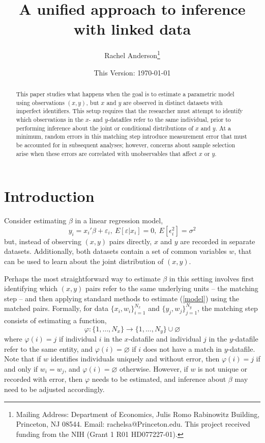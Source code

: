 \documentclass[12pt]{article}
\title{\singlespacing A unified approach to inference with linked data}
\author{Rachel Anderson\thanks{Mailing Address: Department of Economics, Julis Romo Rabinowitz Building,
Princeton, NJ 08544. Email: rachelsa@Princeton.edu.
This project received funding from the NIH (Grant 1 R01 HD077227-01). }}
\date{This Version: \today}
\begin{document}
\maketitle


\begin{abstract}
\singlespacing
\noindent This paper studies what happens when the goal is to estimate a parametric model using observations $(x,y)$, but $x$ and $y$ are observed in distinct datasets with imperfect identifiers.  This setup requires that the researcher must attempt to identify which observations in the $x$- and $y$-datafiles refer to the same individual, prior to performing inference about the joint or conditional distributions of $x$ and $y$.  At a minimum, random errors in this matching step introduce measurement error that must be accounted for in subsequent analyses; however, concerns about sample selection arise when these errors are correlated with unobservables that affect $x$ or $y$.  \end{abstract}


\section{Introduction}

Consider estimating $\beta$ in a linear regression model, \begin{equation} y_i = x_i'\beta + \varepsilon_i, \ E[\varepsilon | x_i] = 0, \ E[\epsilon_i^2] = \sigma^2  \label{model} \end{equation}
but, instead of observing $(x, y)$ pairs directly,  $x$ and $y$ are recorded in separate datasets.  Additionally, both datasets contain a set of common variables $w$, that can be used to learn about the joint distribution of $(x,y)$.

Perhaps the most straightforward way to estimate $\beta$ in this setting involves first identifying which $(x,y)$ pairs refer to the same underlying units -- the matching step -- and then applying standard methods to estimate (\ref{model}) using the matched pairs.   Formally, for data $\{x_i, w_i\}_{i=1}^{N_x}$ and $\{y_j, w_j\}_{j=1}^{N_y}$, the matching step consists of estimating a function, \begin{equation} \varphi: \{1,\dots, N_x\} \to \{1,\dots, N_y\} \cup \varnothing \end{equation} where $\varphi(i) = j$ if individual $i$ in the $x$-datafile and individual $j$ in the $y$-datafile refer to the same entity, and $\varphi(i) = \varnothing$ if $i$ does not have a match in $y$-datafile.  Note that if $w$ identifies individuals uniquely and without error, then $\varphi(i) = j$ if and only if $w_i = w_j$, and $\varphi(i) = \varnothing$ otherwise.  However, if $w$ is not unique or recorded with error, then $\varphi$ needs to be estimated, and inference about $\beta$ may need to be adjusted accordingly.   
\end{document}
